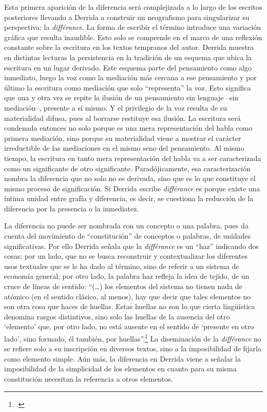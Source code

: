 Esta primera aparición de la diferencia será complejizada a lo largo de
los escritos posteriores llevando a Derrida a construir un neografismo
para singularizar su perspectiva: la \emph{différance}. La forma de
escribir el término introduce una variación gráfica que resulta
inaudible. Esto solo se comprende en el marco de una reflexión constante
sobre la escritura en los textos tempranos del autor. Derrida muestra en
distintas lecturas la persistencia en la tradición de un esquema que
ubica la escritura en un lugar derivado. Este esquema parte del
pensamiento como algo inmediato, luego la voz como la mediación más
cercana a ese pensamiento y por último la escritura como mediación que
solo \enquote{representa} la voz. Esto significa que una y otra vez se repite la
ilusión de un pensamiento sin lenguaje --sin mediación--, presente a sí
mismo. Y el privilegio de la voz resulta de su materialidad difusa, pues
al borrarse restituye esa ilusión. La escritura será condenada entonces
no solo porque es una mera representación del habla como primera
mediación, sino porque su materialidad viene a mostrar el carácter
irreductible de las mediaciones en el mismo seno del pensamiento. Al
mismo tiempo, la escritura en tanto mera representación del habla va a
ser caracterizada como un significante de otro significante.
Paradójicamente, esa caracterización nombra la diferencia que no solo no
es derivada, sino que es lo que constituye el mismo proceso de
significación. Si Derrida escribe \emph{différance} es porque existe una
íntima unidad entre grafía y diferencia, es decir, se cuestiona la
reducción de la diferencia por la presencia o la inmediatez.

La diferencia no puede ser nombrada con un concepto o una palabra, pues
da cuenta del movimiento de \enquote{constitución} de conceptos o palabras, de
unidades significativas. Por ello Derrida señala que la
\emph{différance} es un \enquote{haz} indicando dos cosas: por un lado, que no
se busca reconstruir y contextualizar los diferentes usos textuales que
se le ha dado al término, sino de referir a un sistema de economía
general; por otro lado, la palabra haz refleja la idea de tejido, de un
cruce de líneas de sentido: \enquote{(\dots) los elementos del sistema no
tienen nada de atómico (en el sentido clásico, al menos), hay que decir
que tales elementos no son otra cosa que haces de huellas. Estas huellas
no son lo que cierta lingüística denomina rasgos distintivos, sino solo
las huellas de la ausencia del otro \enquote{elemento} que, por otro lado, no
está ausente en el sentido de \enquote{presente en otro lado}, sino formado,
él también, por huellas}.\footcite[95]{bennington1994} La diseminación de la
\emph{différance} no se refiere solo a su inscripción en diversos
textos, sino a la imposibilidad de fijarla como elemento simple. Aún
más, la diferencia en Derrida viene a señalar la imposibilidad de la
simplicidad de los elementos en cuanto para su misma constitución
necesitan la referencia a otros elementos.

